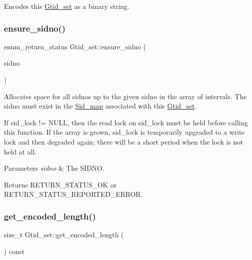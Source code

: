 Encodes this \mbox{\hyperlink{classGtid__set}{Gtid\+\_\+set}} as a binary string. \mbox{\label{classGtid__set_a4f026631d33627a5c273bdc35dcc03ef}} 
\subsubsection{\texorpdfstring{ensure\+\_\+sidno()}{ensure\_sidno()}}
{\footnotesize\ttfamily enum\+\_\+return\+\_\+status Gtid\+\_\+set\+::ensure\+\_\+sidno (\begin{DoxyParamCaption}\item[{rpl\+\_\+sidno}]{sidno }\end{DoxyParamCaption})}

Allocates space for all sidnos up to the given sidno in the array of intervals. The sidno must exist in the \mbox{\hyperlink{classSid__map}{Sid\+\_\+map}} associated with this \mbox{\hyperlink{classGtid__set}{Gtid\+\_\+set}}.

If sid\+\_\+lock != N\+U\+LL, then the read lock on sid\+\_\+lock must be held before calling this function. If the array is grown, sid\+\_\+lock is temporarily upgraded to a write lock and then degraded again; there will be a short period when the lock is not held at all.


\begin{DoxyParams}{Parameters}
{\em sidno} & The S\+I\+D\+NO. \\
\hline
\end{DoxyParams}
\begin{DoxyReturn}{Returns}
R\+E\+T\+U\+R\+N\+\_\+\+S\+T\+A\+T\+U\+S\+\_\+\+OK or R\+E\+T\+U\+R\+N\+\_\+\+S\+T\+A\+T\+U\+S\+\_\+\+R\+E\+P\+O\+R\+T\+E\+D\+\_\+\+E\+R\+R\+OR. 
\end{DoxyReturn}
\mbox{\label{classGtid__set_ac92c3495294a8533401fe17ea6e250f4}} 
\subsubsection{\texorpdfstring{get\+\_\+encoded\+\_\+length()}{get\_encoded\_length()}}
{\footnotesize\ttfamily size\+\_\+t Gtid\+\_\+set\+::get\+\_\+encoded\+\_\+length (\begin{DoxyParamCaption}{ }\end{DoxyParamCaption}) const}

